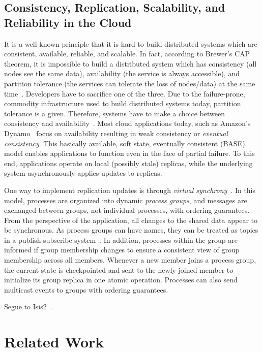 \documentclass[a4paper,12pt,twoside,openright]{report}
\begin{document}
\section{Consistency, Replication, Scalability, and Reliability in the
Cloud}\label{chapter:background:section:consistency}
It is a well-known principle that it is hard to build distributed systems which
are consistent, available, reliable, and scalable. In fact, according to
Brewer's CAP theorem, it is impossible to build a distributed system which has
consistency (all nodes see the same data), availability (the service is always
accessible), and partition tolerance (the services can tolerate the loss of
nodes/data) at the same time~\cite{Brewer:2000:TRD,Gilbert:2002:BCF}. Developers
have to sacrifice one of the three. Due to the failure-prone, commodity
infrastructure used to build distributed systems today, partition tolerance is a
given. Therefore, systems have to make a choice between consistency and
availability~\cite{Vogels:2009:EC}. Most cloud applications today, such as
Amazon's Dynamo~\cite{DeCandia:2007:DAH} focus on availability resulting in weak
consistency or \emph{eventual consistency}. This basically available, soft
state, eventually consistent (BASE)~\cite{Pritchett:2008:BAA} model enables
applications to function even in the face of partial failure. To this end,
applications operate on local (possibly stale) replicas, while the underlying
system asynchronously applies updates to replicas.

One way to implement replication updates is through \emph{virtual
synchrony}~\cite{Birman:1987:EVS}. In this model, processes are organized into
dynamic \emph{process groups}, and messages are exchanged between groups, not
individual processes, with ordering guarantees. From the perspective of the
application, all changes to the shared data appear to be synchronous. As process
groups can have names, they can be treated as topics in a publish-subscribe
system~\cite{Birman:2010:AHO}. In addition, processes within the group are
informed if group membership changes to ensure a consistent view of group
membership across all members. Whenever a new member joins a process group, the
current state is checkpointed and sent to the newly joined member to initialize
its group replica in one atomic operation. Processes can also send multicast
events to groups with ordering guarantees.

Segue to Isis2~\cite{Birman:2012:OCW}.

\chapter{Related Work}\label{chapter:relatedWork}
\end{document}
